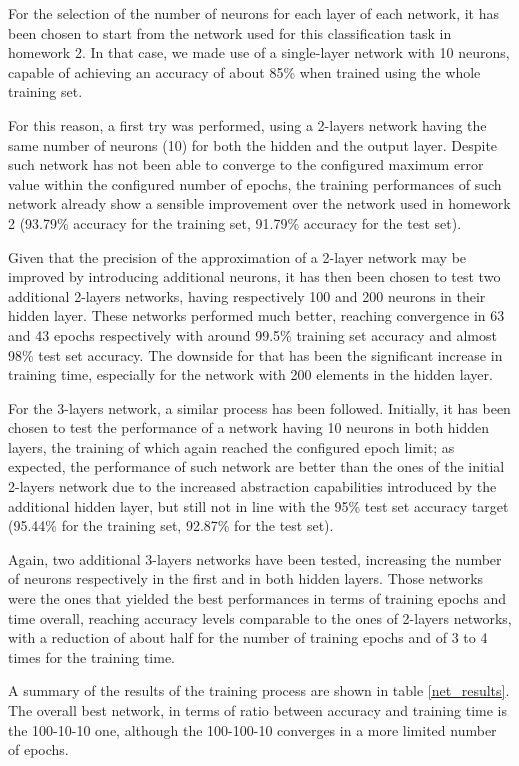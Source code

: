 \documentclass[letterpaper,headings=standardclasses]{scrartcl}
\begin{document}
For the selection of the number of neurons for each layer of each network, it has been chosen to start from the network used for this classification task in homework 2. In that case, we made use of a single-layer network with 10 neurons, capable of achieving an accuracy of about 85\% when trained using the whole training set.

For this reason, a first try was performed, using a 2-layers network having the same number of neurons (10) for both the hidden and the output layer. Despite such network has not been able to converge to the configured maximum error value within the configured number of epochs, the training performances of such network already show a sensible improvement over the network used in homework 2 (93.79\% accuracy for the training set, 91.79\% accuracy for the test set).

Given that the precision of the approximation of a 2-layer network may be improved by introducing additional neurons, it has then been chosen to test two additional 2-layers networks, having respectively 100 and 200 neurons in their hidden layer. These networks performed much better, reaching convergence in 63 and 43 epochs respectively with around 99.5\% training set accuracy and almost 98\% test set accuracy. The downside for that has been the significant increase in training time, especially for the network with 200 elements in the hidden layer.

For the 3-layers network, a similar process has been followed. Initially, it has been chosen to test the performance of a network having 10 neurons in both hidden layers, the training of which again reached the configured epoch limit; as expected, the performance of such network are better than the ones of the initial 2-layers network due to the increased abstraction capabilities introduced by the additional hidden layer, but still not in line with the 95\% test set accuracy target (95.44\% for the training set, 92.87\% for the test set).

Again, two additional 3-layers networks have been tested, increasing the number of neurons respectively in the first and in both hidden layers. Those networks were the ones that yielded the best performances in terms of training epochs and time overall, reaching accuracy levels comparable to the ones of 2-layers networks, with a reduction of about half for the number of training epochs and of 3 to 4 times for the training time.

A summary of the results of the training process are shown in table \ref{net_results}. The overall best network, in terms of ratio between accuracy and training time is the 100-10-10 one, although the 100-100-10 converges in a more limited number of epochs.
\end{document}

